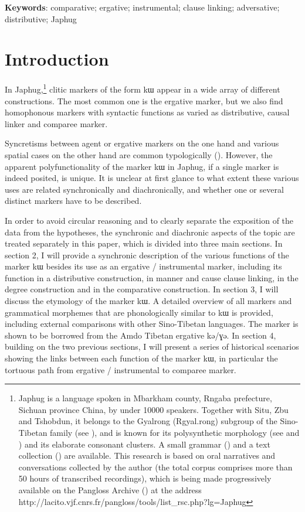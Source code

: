 \documentclass[oldfontcommands,oneside,a4paper,11pt]{article}
\newcommand{\ipa}[1]{{\phon #1}} %
\begin{document}
\textbf{Keywords}: comparative; ergative; instrumental; clause linking; adversative; distributive; Japhug
  
\section{Introduction}
  
 
 
In Japhug,\footnote{Japhug is a language spoken in Mbarkham county, Rngaba prefecture, Sichuan province China, by under 10000 speakers. Together with Situ, Zbu and Tshobdun, it belongs to the Gyalrong (Rgyal.rong) subgroup of the Sino-Tibetan family (see \citealt{jackson00sidaba}), and is known for its polysynthetic morphology (see \citealt{jacques13harmonization} and  \citealt{jacques14antipassive}) and its elaborate consonant clusters. A small grammar  (\citealt{jacques08zh}) and a text collection (\citealt{jacques10gesar}) are available.  This research is based on oral narratives and conversations collected by the author (the total corpus comprises more than 50 hours of transcribed recordings), which is being made progressively available on the Pangloss Archive (\citealt{michailovsky14pangloss}) at the address http://lacito.vjf.cnrs.fr/pangloss/tools/list\_rsc.php?lg=Japhug } clitic markers of the form \ipa{kɯ} appear in a wide array of different constructions. The most common one is the ergative marker, but we also find homophonous markers with syntactic functions as varied as distributive, causal linker  and  comparee marker. 

Syncretisms between agent or ergative markers  on the one hand and various spatial cases on the other hand are common typologically (\citealt{agent02palancar}). However, the apparent polyfunctionality of the marker \ipa{kɯ} in Japhug, if a single marker is indeed posited, is unique. It is unclear at first glance to what extent these various uses are related synchronically and diachronically, and whether one or several distinct markers have to be described. 
 
 In order to avoid circular reasoning and to clearly  separate the exposition of the data from the hypotheses, the synchronic and diachronic aspects of the topic are treated separately in this paper, which is divided into three main sections. In section 2, I will provide a synchronic description of the various functions of the marker \ipa{kɯ} besides its use as an ergative / instrumental marker, including its function in a distributive construction, in manner and cause clause linking, in the degree construction and in the comparative construction.  In section 3, I will discuss the etymology of the marker \ipa{kɯ}. A detailed overview of all markers and grammatical morphemes that are phonologically similar to \ipa{kɯ} is provided, including external comparisons with other Sino-Tibetan languages.  The marker is shown to be borrowed from the Amdo Tibetan ergative \ipa{kə/ɣə}. In section 4, building on the two previous sections, I will present a series of historical scenarios showing the links between each function of the marker \ipa{kɯ}, in particular the tortuous path from ergative / instrumental to comparee marker.
\end{document}

